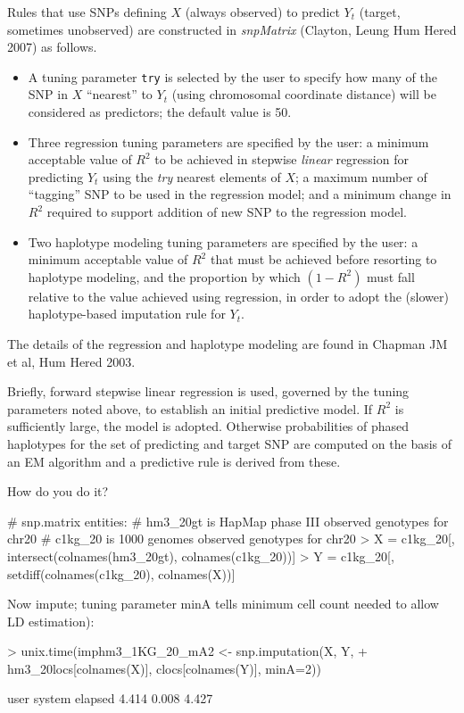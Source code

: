 {\huge

Rules that use SNPs defining $X$ (always observed) to predict $Y_t$
(target, sometimes unobserved) are constructed in \textit{snpMatrix}
(Clayton, Leung Hum Hered 2007) as follows.
\begin{itemize}
\item A tuning parameter \texttt{try} is selected by the user to
specify how many of the SNP in $X$ ``nearest'' to $Y_t$ (using
chromosomal coordinate distance) will
be considered as predictors; the default value is 50.
\item Three regression tuning parameters are specified by the user:
a minimum acceptable value of $R^2$ to be achieved in stepwise
\textit{linear} regression for predicting $Y_t$ using the 
\textit{try} nearest elements of $X$; a maximum number of ``tagging'' SNP
to be used in the regression model; and a minimum change in $R^2$
required to support addition of new SNP to the regression model.
\item Two haplotype modeling tuning parameters are specified by the user:
a minimum acceptable value of $R^2$ that must be achieved before
resorting to haplotype modeling, and the proportion by which $(1-R^2)$ must
fall relative to the value achieved using regression, in order to
adopt the (slower) haplotype-based imputation rule for $Y_t$.
\end{itemize}

}

\clearpage

{\huge
The details of the regression and haplotype modeling are found in
Chapman JM et al, Hum Hered 2003.  

Briefly, forward stepwise linear regression is used,
governed by the tuning parameters noted above, to establish an initial
predictive model.  If $R^2$ is sufficiently large, the model is adopted.
Otherwise probabilities of phased haplotypes for the set of predicting and target SNP
are computed on the basis of an EM algorithm
and a predictive rule is derived from these.
}

\clearpage


{\huge How do you do it?}

\begin{Schunk}
\begin{Sinput}
# snp.matrix entities:
# hm3_20gt is HapMap phase III observed genotypes for chr20
# c1kg_20 is 1000 genomes observed genotypes for chr20
> X = c1kg_20[, intersect(colnames(hm3_20gt), colnames(c1kg_20))]
> Y = c1kg_20[, setdiff(colnames(c1kg_20), colnames(X))]
\end{Sinput}
\end{Schunk}
Now impute; tuning parameter minA tells minimum cell count needed
to allow LD estimation):
\begin{Schunk}
\begin{Sinput}
> unix.time(imphm3_1KG_20_mA2 <- snp.imputation(X, Y, 
+            hm3_20locs[colnames(X)], clocs[colnames(Y)], minA=2))
\end{Sinput}
\begin{Soutput}
   user  system elapsed 
  4.414   0.008   4.427 
\end{Soutput}
\end{Schunk}

